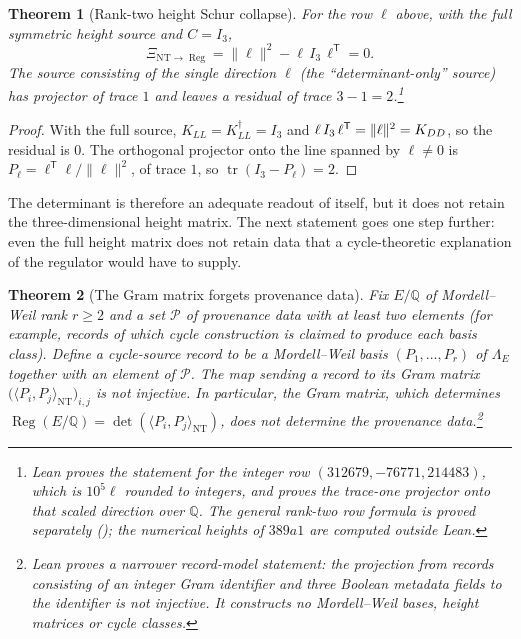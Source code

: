 \documentclass[11pt]{article}
\newtheorem{theorem}{Theorem}[section]
\theoremstyle{definition}
\newcommand{\Q}{\mathbb{Q}}
\newcommand{\Reg}{\operatorname{Reg}}
\newcommand{\tr}{\operatorname{tr}}
\newcommand{\KLL}{K_{LL}}
\newcommand{\Kdagger}{K_{LL}^{\dagger}}  \newcommand{\vsrc}{\mathrm{vsrc}}        \newcommand{\Jone}{J_1}
\begin{document}
\begin{theorem}[Rank-two height Schur collapse]\label{thm:apparatus:rank-two-height-schur-collapse}
For the row $\ell$ above, with the full symmetric height source and
$C=I_3$,
\[
  \Xi_{\mathrm{NT}\to\Reg}=\|\ell\|^2-\ell\,I_3\,\ell^{\mathsf T}=0 .
\]
The source consisting of the single direction $\ell$ (the
``determinant-only'' source) has projector of trace $1$ and leaves a
residual of trace $3-1=2$.\footnote{Lean proves the statement for the integer row
$(312679,-76771,214483)$, which is $10^5\ell$ rounded to integers, and
proves the trace-one projector onto that scaled direction over $\Q$.  The
general rank-two row formula is proved separately
(); the numerical heights of
$389a1$ are computed outside Lean.}
\end{theorem}

\begin{proof}
With the full source, $\KLL=\Kdagger=I_3$ and
$\ell\,I_3\,\ell^{\mathsf T}=\|\ell\|^2=K_{DD}$, so the residual is $0$.  The
orthogonal projector onto the line spanned by $\ell\neq0$ is
$P_\ell=\ell^{\mathsf T}\ell/\|\ell\|^2$, of trace $1$, so
$\tr(I_3-P_\ell)=2$.
\end{proof}

The determinant is therefore an adequate readout of itself, but it does
not retain the three-dimensional height matrix.  The next statement goes
one step further: even the full height matrix does not retain data that a
cycle-theoretic explanation of the regulator would have to supply.

\begin{theorem}[The Gram matrix forgets provenance data]\label{thm:apparatus:gram-matrix-shadow}
Fix $E/\Q$ of Mordell--Weil rank $r\ge2$ and a set $\mathcal P$ of
provenance data with at least two elements (for example, records of which
cycle construction is claimed to produce each basis class).  Define a
\emph{cycle-source record} to be a Mordell--Weil basis
$(P_1,\ldots,P_r)$ of $\Lambda_E$ together with an element of
$\mathcal P$.
The map sending a record to its Gram matrix
$\bigl(\langle P_i,P_j\rangle_{\mathrm{NT}}\bigr)_{i,j}$ is not injective.
In particular, the Gram matrix, which determines
$\Reg(E/\Q)=\det(\langle P_i,P_j\rangle_{\mathrm{NT}})$, does not determine
the provenance data.\footnote{Lean proves a narrower record-model statement: the projection
from records consisting of an integer Gram identifier and three Boolean
metadata fields to the identifier is not injective.  It constructs no
Mordell--Weil bases, height matrices or cycle classes.}
\end{theorem}
\end{document}
